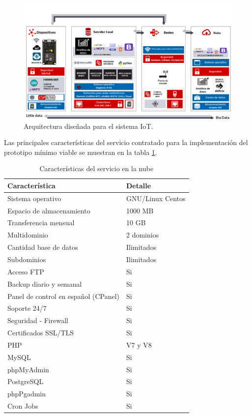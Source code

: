 \begin{landscape} %
\begin{figure}[htpb]
\centering 
\includegraphics[width=1.65\textwidth]{./Figures/arquitectura-listo.png}
\caption{Arquitectura diseñada para el sistema IoT.}
\label{fig:arquitectura}
\end{figure}
\end{landscape} %
Las principales características  del servicio contratado para la implementación del prototipo mínimo viable se muestran en la tabla \ref{tab:serverweb}.


\begin{table}[h]
	\centering
	\caption[Características del servicio en la nube]{Características del servicio en la nube}
	\begin{tabular}{p{7cm} p{5cm} }    
		\toprule
		\textbf{Característica} 	 & \textbf{Detalle}  \\
		\midrule
		Sistema operativo  & GNU/Linux Centos\\		
		Espacio de almacenamiento & 1000 MB \\
		Transferencia mensual  & 10 GB\\		
		Multidominio & 2 dominios\\		
		Cantidad base de datos 	  & Ilimitados\\
		Subdominios 	  & Ilimitados\\
		Acceso FTP 	  & Si\\
		Backup diario y semanal 	  & Si\\
		Panel de control en español (CPanel) 	  & Si\\
		Soporte 24/7 	  & Si\\
		Seguridad - Firewall	  & Si\\
		Certificados SSL/TLS	  & Si\\
		PHP	  & V7 y V8\\
		MySQL	  & Si\\
		phpMyAdmin	  & Si\\
		PostgreSQL	  & Si\\
		phpPgadmin	  & Si\\
		Cron Jobs	  & Si\\
		\bottomrule
		\hline
	\end{tabular}
	\label{tab:serverweb}
\end{table}

